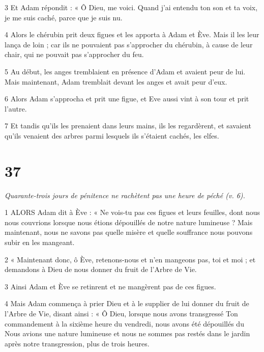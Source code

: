 \par 3 Et Adam répondit : « Ô Dieu, me voici. Quand j'ai entendu ton son et ta voix, je me suis caché, parce que je suis nu.

\par 4 Alors le chérubin prit deux figues et les apporta à Adam et Ève. Mais il les leur lança de loin ; car ils ne pouvaient pas s'approcher du chérubin, à cause de leur chair, qui ne pouvait pas s'approcher du feu.

\par 5 Au début, les anges tremblaient en présence d'Adam et avaient peur de lui. Mais maintenant, Adam tremblait devant les anges et avait peur d'eux.

\par 6 Alors Adam s'approcha et prit une figue, et Eve aussi vint à son tour et prit l'autre.

\par 7 Et tandis qu'ils les prenaient dans leurs mains, ils les regardèrent, et savaient qu'ils venaient des arbres parmi lesquels ils s'étaient cachés, les elfes.

\chapter{37}

\par \textit{Quarante-trois jours de pénitence ne rachètent pas une heure de péché (v. 6).}

\par 1 ALORS Adam dit à Ève : « Ne vois-tu pas ces figues et leurs feuilles, dont nous nous couvrions lorsque nous étions dépouillés de notre nature lumineuse ? Mais maintenant, nous ne savons pas quelle misère et quelle souffrance nous pouvons subir en les mangeant.

\par 2 « Maintenant donc, ô Ève, retenons-nous et n'en mangeons pas, toi et moi ; et demandons à Dieu de nous donner du fruit de l’Arbre de Vie.

\par 3 Ainsi Adam et Ève se retinrent et ne mangèrent pas de ces figues.

\par 4 Mais Adam commença à prier Dieu et à le supplier de lui donner du fruit de l'Arbre de Vie, disant ainsi : « Ô Dieu, lorsque nous avons transgressé Ton commandement à la sixième heure du vendredi, nous avons été dépouillés du Nous avions une nature lumineuse et nous ne sommes pas restés dans le jardin après notre transgression, plus de trois heures.

